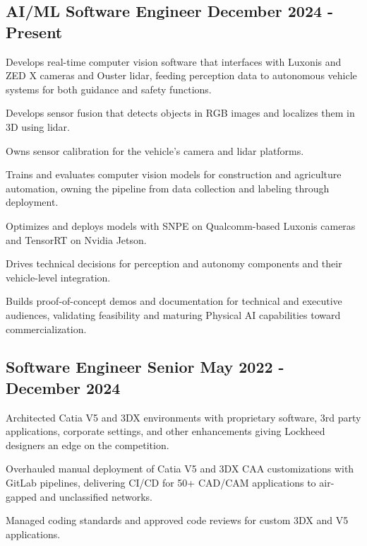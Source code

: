 \subsection{{AI/ML Software Engineer \hfill December 2024 - Present}}
\begin{zitemize}
	\item Develops real-time computer vision software that interfaces with Luxonis and ZED X cameras and Ouster lidar, feeding perception data to autonomous vehicle systems for both guidance and safety functions.
	\item Develops sensor fusion that detects objects in RGB images and localizes them in 3D using lidar.
	\item Owns sensor calibration for the vehicle's camera and lidar platforms.
	\item Trains and evaluates computer vision models for construction and agriculture automation, owning the pipeline from data collection and labeling through deployment.
	\item Optimizes and deploys models with SNPE on Qualcomm-based Luxonis cameras and TensorRT on Nvidia Jetson.
	\item Drives technical decisions for perception and autonomy components and their vehicle-level integration.
	\item Builds proof-of-concept demos and documentation for technical and executive audiences, validating feasibility and maturing Physical AI capabilities toward commercialization.
\end{zitemize}

\subsection{{Software Engineer Senior \hfill May 2022 - December 2024}}
\begin{zitemize}
	\item Architected Catia V5 and 3DX environments with proprietary software, 3rd party applications, corporate settings, and other enhancements giving Lockheed designers an edge on the competition.
	\item Overhauled manual deployment of Catia V5 and 3DX CAA customizations with GitLab pipelines, delivering CI/CD for 50+ CAD/CAM applications to air-gapped and unclassified networks.
	\item Managed coding standards and approved code reviews for custom 3DX and V5 applications.
\end{zitemize}

